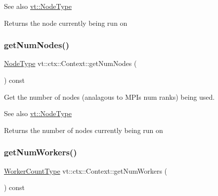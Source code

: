 \begin{DoxySeeAlso}{See also}
{\ttfamily \hyperlink{namespacevt_a866da9d0efc19c0a1ce79e9e492f47e2}{vt\+::\+Node\+Type}} 
\end{DoxySeeAlso}
\begin{DoxyReturn}{Returns}
the node currently being run on 
\end{DoxyReturn}
\mbox{\label{structvt_1_1ctx_1_1_context_a7f41071aadf6d5fa9e1b6c703c5ff19d}} 
\subsubsection{\texorpdfstring{get\+Num\+Nodes()}{getNumNodes()}}
{\footnotesize\ttfamily \hyperlink{namespacevt_a866da9d0efc19c0a1ce79e9e492f47e2}{Node\+Type} vt\+::ctx\+::\+Context\+::get\+Num\+Nodes (\begin{DoxyParamCaption}{ }\end{DoxyParamCaption}) const\hspace{0.3cm}{\ttfamily [inline]}}



Get the number of nodes (analagous to M\+PI\textquotesingle{}s num ranks) being used. 

\begin{DoxySeeAlso}{See also}
{\ttfamily \hyperlink{namespacevt_a866da9d0efc19c0a1ce79e9e492f47e2}{vt\+::\+Node\+Type}} 
\end{DoxySeeAlso}
\begin{DoxyReturn}{Returns}
the number of nodes currently being run on 
\end{DoxyReturn}
\mbox{\label{structvt_1_1ctx_1_1_context_a0ea881fa8c4d8fee74e85d8a6c52a6f0}} 
\subsubsection{\texorpdfstring{get\+Num\+Workers()}{getNumWorkers()}}
{\footnotesize\ttfamily \hyperlink{namespacevt_aa93398ea48f2cb6c188512250f7cc248}{Worker\+Count\+Type} vt\+::ctx\+::\+Context\+::get\+Num\+Workers (\begin{DoxyParamCaption}{ }\end{DoxyParamCaption}) const\hspace{0.3cm}{\ttfamily [inline]}}



